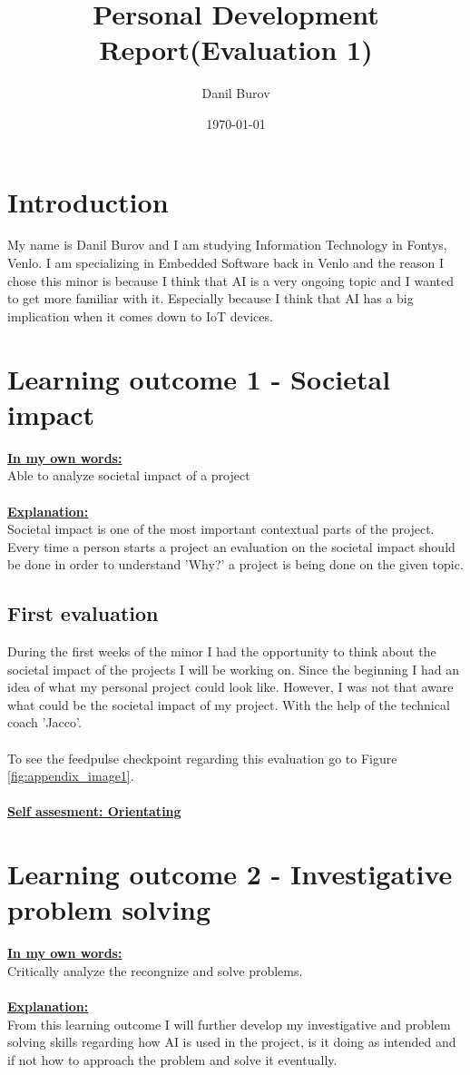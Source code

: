 \documentclass{article}
\title{Personal Development Report(Evaluation 1)}
\author{Danil Burov}
\date{\today}
\begin{document}
\maketitle
\newpage
\tableofcontents
\newpage

\section{Introduction}
My name is Danil Burov and I am studying Information Technology in Fontys, Venlo. I am specializing in 
Embedded Software back in Venlo and the reason I chose this minor is because I think that AI is a very 
ongoing topic and I wanted to get more familiar with it. Especially because I think that AI has a big 
implication when it comes down to IoT devices.

\section{Learning outcome 1 - Societal impact}
\underline{\textbf{In my own words:}}\\
Able to analyze societal impact of a project\\\\
\underline{\textbf{Explanation:}}\\
Societal impact is one of the most important contextual parts of the project. Every time a person 
starts a project an evaluation on the societal impact should be done in order to understand 'Why?'
a project is being done on the given topic.
\subsection{First evaluation}
During the first weeks of the minor I had the opportunity to think about the societal impact of the projects I will 
be working on. Since the beginning I had an idea of what my personal project could look like. However, I was not that aware
what could be the societal impact of my project. With the help of the technical coach 'Jacco'.\\\\
To see the feedpulse checkpoint regarding this evaluation go to Figure \ref{fig:appendix_image1}.
\\\\
\underline{\textbf{Self assesment: Orientating}}

\section{Learning outcome 2 - Investigative problem solving}
\underline{\textbf{In my own words:}}\\
Critically analyze the recongnize and solve problems.\\\\ 
\underline{\textbf{Explanation:}}\\
From this learning outcome I will further develop my investigative and problem solving skills regarding 
how AI is used in the project, is it doing as intended and if not how to approach the problem and solve it 
eventually.
\end{document}
